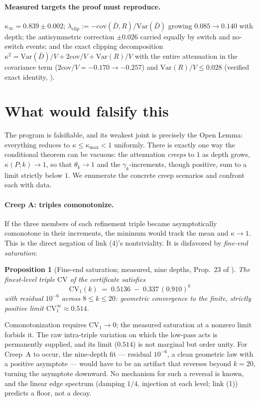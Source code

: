\documentclass[11pt]{article}
\newtheorem{proposition}[theorem]{Proposition}
\theoremstyle{definition}
\theoremstyle{remark}
\newcommand{\CV}{\mathrm{CV}}
\newcommand{\Var}{\mathrm{Var}}
\newcommand{\cov}{\mathrm{cov}}
\newcommand{\lam}{\lambda}
\newcommand{\gam}{\gamma}
\newcommand{\kap}{\kappa}
\begin{document}
\paragraph{Measured targets the proof must reproduce.}
$\kap_\infty = 0.839 \pm 0.002$; $\lam_{\mathrm{clip}} := -\cov(\bar D, R)/
\Var(\bar D)$ growing $0.085 \to 0.140$ with depth; the antisymmetric
correction $\pm 0.026$ carried equally by switch and no-switch events; and the
exact clipping decomposition $\kap^2 = \Var(\bar D)/V + 2\cov/V + \Var(R)/V$
with the entire attenuation in the covariance term ($2\cov/V = -0.170 \to
-0.257$) and $\Var(R)/V \leq 0.028$ (verified exact identity, \cite{Drift26}).

\section{What would falsify this}
\label{sec:falsify}

The program is falsifiable, and its weakest joint is precisely the Open Lemma:
everything reduces to $\kap \leq \kap_{\max} < 1$ uniformly. There is exactly
one way the conditional theorem can be vacuous: the attenuation \emph{creeps} to
$1$ as depth grows, $\kap(P; k) \to 1$, so that $\theta_k \to 1$ and the
$\gam_k$-increments, though positive, sum to a limit strictly below $1$. We
enumerate the concrete creep scenarios and confront each with data.

\paragraph{Creep A: triples comonotonize.}
If the three members of each refinement triple became asymptotically comonotone
in their increments, the minimum would track the mean and $\kap \to 1$. This is
the direct negation of link (4)'s nontriviality. It is disfavored by
\emph{fine-end saturation}:

\begin{proposition}[Fine-end saturation; measured, nine depths, Prop.~23 of
\cite{NOTE}]\label{prop:cv1}
The finest-level triple $\CV$ of the certificate satisfies
\[
\CV_1(k) \;=\; 0.5136 \;-\; 0.337\,(0.910)^k
\]
with residual $10^{-6}$ across $8 \leq k \leq 20$: geometric convergence to the
finite, strictly positive limit $\CV_1^\infty \approx 0.514$.
\end{proposition}

Comonotonization requires $\CV_1 \to 0$; the measured saturation at a nonzero
limit forbids it. The raw intra-triple variation on which the low-pass acts is
permanently supplied, and its limit ($0.514$) is not marginal but order unity.
For Creep~A to occur, the nine-depth fit --- residual $10^{-6}$, a clean
geometric law with a positive asymptote --- would have to be an artifact that
reverses beyond $k = 20$, turning the asymptote downward. No mechanism for such
a reversal is known, and the linear edge spectrum (damping $1/4$, injection at
each level; link (1)) predicts a floor, not a decay.
\end{document}
